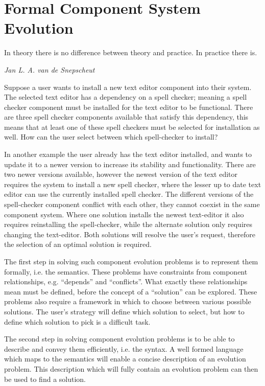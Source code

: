 \chapter{Formal Component System Evolution}
\label{formal}
\epigraph{In theory there is no difference between theory and practice. In practice there is.}
{\textit{Jan L. A. van de Snepscheut}}
Suppose a user wants to install a new text editor component into their system.
The selected text editor has a dependency on a spell checker;
meaning a spell checker component must be installed for the text editor to be functional.
There are three spell checker components available that satisfy this dependency,
this means that at least one of these spell checkers must be selected for installation as well.
How can the user select between which spell-checker to install? 

In another example the user already has the text editor installed, and wants to update it to a newer version to increase its stability and functionality.
There are two newer versions available, however the newest version of the text editor requires the system to install a new spell checker,
where the lesser up to date text editor can use the currently installed spell checker.
The different versions of the spell-checker component conflict with each other, they cannot coexist in the same component system.
Where one solution installs the newest text-editor it also requires reinstalling the spell-checker, 
while the alternate solution only requires changing the text-editor.
Both solutions will resolve the user's request, therefore the selection of an optimal solution is required.  

The first step in solving such component evolution problems is to represent them formally, i.e. the semantics.
These problems have constraints from component relationships, e.g. ``depends'' and ``conflicts''.
What exactly these relationships mean must be defined, before the concept of a ``solution'' can be explored.
These problems also require a framework in which to choose between various possible solutions.
The user's strategy will define which solution to select, but how to define which solution to pick is a difficult task.

The second step in solving component evolution problems is to be able to describe and convey them efficiently, i.e. the syntax.
A well formed language which maps to the semantics will enable a concise description of an evolution problem.
This description which will fully contain an evolution problem can then be used to find a solution.

